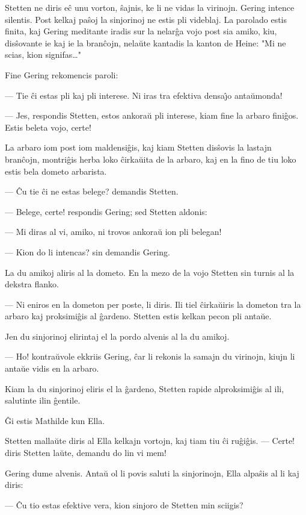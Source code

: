    Stetten ne diris e\^c unu vorton, \^sajnis, ke li ne vidas la virinojn.
Gering intence silentis. Post kelkaj pa\^soj la sinjorinoj ne estis
pli videblaj. La parolado estis finita, kaj Gering meditante iradis
sur la nelar\^ga vojo post sia amiko, kiu, dis\^sovante ie kaj ie la
bran\^cojn, nela\u ute kantadis la kanton de Heine: "Mi ne scias,
kion signifas\dots"

   Fine Gering rekomencis paroli:

 --- Tie \^ci estas pli kaj pli interese. Ni iras tra efektiva densa\^{\j}o
anta\u umonda!

 --- Jes, respondis Stetten, estos ankora\u u pli interese, kiam fine la
arbaro fini\^gos. Estis beleta vojo, certe!

   La arbaro iom post iom maldensi\^gis, kaj kiam Stetten dis\^sovis la
lastajn bran\^cojn, montri\^gis herba loko \^cirka\u uita de la
arbaro, kaj en la fino de tiu loko estis bela dometo arbarista.

 --- \^Cu tie \^ci ne estas belege? demandis Stetten.

 --- Belege, certe! respondis Gering; sed Stetten aldonis:

 --- Mi diras al vi, amiko, ni trovos ankora\u u ion pli belegan!

 --- Kion do li intencas? sin demandis Gering.

   La du amikoj aliris al la dometo. En la mezo de la vojo Stetten sin
turnis al la dekstra flanko.

 --- Ni eniros en la dometon per poste, li diris. Ili tiel \^cirka\u uiris
la dometon tra la arbaro kaj proksimi\^gis al \^gardeno. Stetten
estis kelkan pecon pli anta\u ue.

   Jen du sinjorinoj elirintaj el la pordo alvenis al la du amikoj.

 --- Ho! kontra\u uvole ekkriis Gering, \^car li rekonis la samajn du
virinojn, kiujn li anta\u ue vidis en la arbaro.

   Kiam la du sinjorinoj eliris el la \^gardeno, Stetten rapide
alproksimi\^gis al ili, salutinte ilin \^gentile.

   \^Gi estis Mathilde kun Ella.

   Stetten malla\u ute diris al Ella kelkajn vortojn, kaj tiam tiu \^ci
ru\^gi\^gis. --- Certe! diris Stetten la\u ute, demandu do lin vi
mem!

   Gering dume alvenis. Anta\u u ol li povis saluti la sinjorinojn, Ella
alpa\^sis al li kaj diris:

 --- \^Cu tio estas efektive vera, kion sinjoro de Stetten min sciigis?

